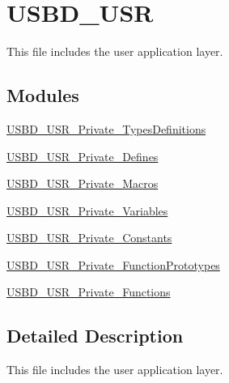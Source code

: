 \hypertarget{group__USBD__USR}{\section{U\-S\-B\-D\-\_\-\-U\-S\-R}
\label{group__USBD__USR}
}


This file includes the user application layer.  


\subsection*{Modules}
\begin{DoxyCompactItemize}
\item 
\hyperlink{group__USBD__USR__Private__TypesDefinitions}{U\-S\-B\-D\-\_\-\-U\-S\-R\-\_\-\-Private\-\_\-\-Types\-Definitions}
\item 
\hyperlink{group__USBD__USR__Private__Defines}{U\-S\-B\-D\-\_\-\-U\-S\-R\-\_\-\-Private\-\_\-\-Defines}
\item 
\hyperlink{group__USBD__USR__Private__Macros}{U\-S\-B\-D\-\_\-\-U\-S\-R\-\_\-\-Private\-\_\-\-Macros}
\item 
\hyperlink{group__USBD__USR__Private__Variables}{U\-S\-B\-D\-\_\-\-U\-S\-R\-\_\-\-Private\-\_\-\-Variables}
\item 
\hyperlink{group__USBD__USR__Private__Constants}{U\-S\-B\-D\-\_\-\-U\-S\-R\-\_\-\-Private\-\_\-\-Constants}
\item 
\hyperlink{group__USBD__USR__Private__FunctionPrototypes}{U\-S\-B\-D\-\_\-\-U\-S\-R\-\_\-\-Private\-\_\-\-Function\-Prototypes}
\item 
\hyperlink{group__USBD__USR__Private__Functions}{U\-S\-B\-D\-\_\-\-U\-S\-R\-\_\-\-Private\-\_\-\-Functions}
\end{DoxyCompactItemize}


\subsection{Detailed Description}
This file includes the user application layer. 